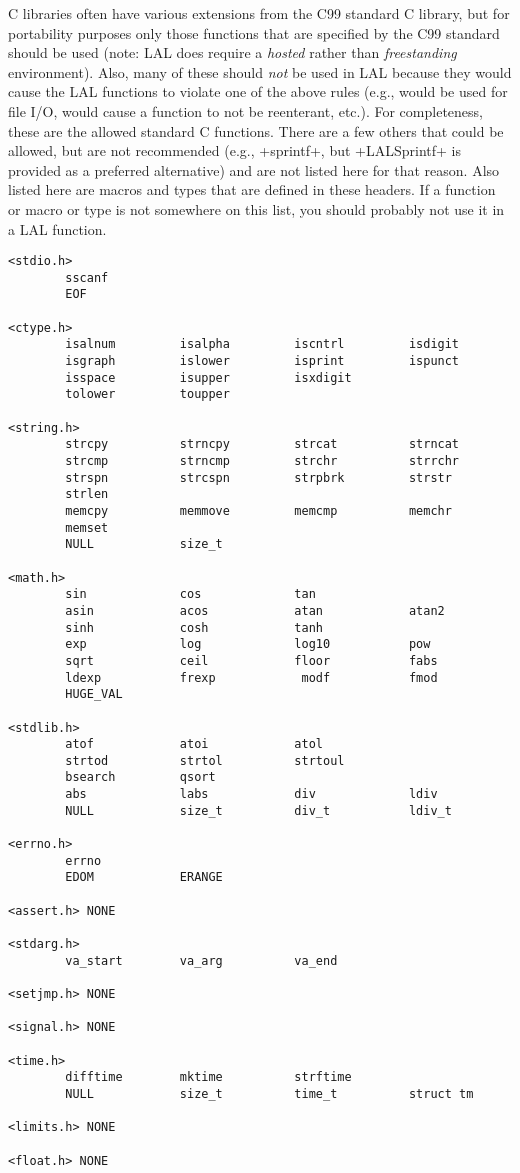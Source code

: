\documentclass[10pt]{ligodcc}
\makeatletter
\def\verb{\relax\ifmmode\hbox\else\leavevmode\null\fi
  \bgroup
    \color{blue}\small
    \verb@eol@error \let\do\@makeother \dospecials
    \verbatim@font\@noligs
    \@ifstar\@sverb\@verb}
\makeatother
\begin{document}
C libraries often have various extensions from the C99 standard C library,
but for portability purposes only those functions that are specified by the
C99 standard should be used (note: LAL does require a \emph{hosted} rather
than \emph{freestanding} environment).  Also, many of these should \emph{not}
be used in LAL because they would cause the LAL functions to violate one of the
above rules (e.g., would be used for file I/O, would cause a function to not
be reenterant, etc.).  For completeness, these are the allowed standard C
functions.  There are a few others that could be allowed, but are not
recommended (e.g., \verb+sprintf+, but \verb+LALSprintf+ is provided as a
preferred alternative) and are not listed here for that reason.  Also listed
here are macros and types that are defined in these headers.  If a function
or macro or type is not somewhere on this list, you should probably not use
it in a LAL function.
\begin{verbatim}
<stdio.h>
        sscanf
        EOF

<ctype.h>
        isalnum         isalpha         iscntrl         isdigit
        isgraph         islower         isprint         ispunct
        isspace         isupper         isxdigit
        tolower         toupper

<string.h>
        strcpy          strncpy         strcat          strncat
        strcmp          strncmp         strchr          strrchr
        strspn          strcspn         strpbrk         strstr
        strlen
        memcpy          memmove         memcmp          memchr
        memset
        NULL            size_t

<math.h>
        sin             cos             tan
        asin            acos            atan            atan2
        sinh            cosh            tanh
        exp             log             log10           pow
        sqrt            ceil            floor           fabs
        ldexp           frexp            modf           fmod
        HUGE_VAL

<stdlib.h>
        atof            atoi            atol
        strtod          strtol          strtoul
        bsearch         qsort
        abs             labs            div             ldiv
        NULL            size_t          div_t           ldiv_t

<errno.h>
        errno
        EDOM            ERANGE

<assert.h> NONE

<stdarg.h>
        va_start        va_arg          va_end

<setjmp.h> NONE

<signal.h> NONE

<time.h>
        difftime        mktime          strftime
        NULL            size_t          time_t          struct tm

<limits.h> NONE

<float.h> NONE
\end{verbatim}
\end{document}
